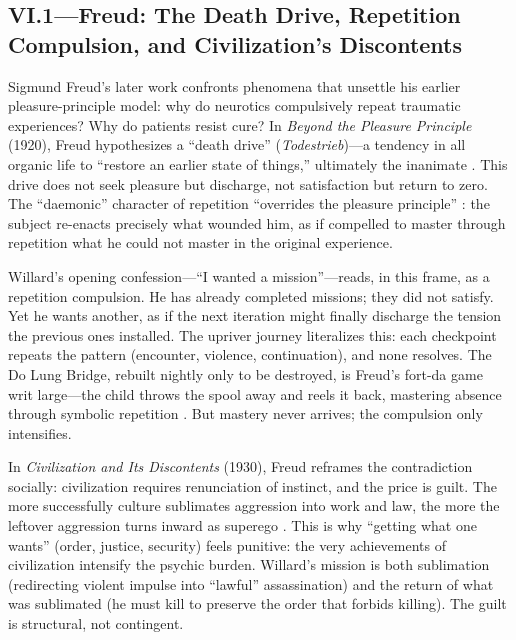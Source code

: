 \subsection*{VI.1—Freud: The Death Drive, Repetition Compulsion, and Civilization's Discontents}
\label{ssec:vi-freud}

Sigmund Freud's later work confronts phenomena that unsettle his earlier pleasure-principle 
model: why do neurotics compulsively repeat traumatic experiences? Why do patients resist cure? 
In \textit{Beyond the Pleasure Principle} (1920), Freud hypothesizes a ``death drive'' 
(\emph{Todestrieb})---a tendency in all organic life to ``restore an earlier state of things,'' 
ultimately the inanimate \parencite[p.~38]{FreudBeyond1955}. This drive does not seek pleasure 
but discharge, not satisfaction but return to zero. The ``daemonic'' character of repetition 
``overrides the pleasure principle'' \parencite[p.~22]{FreudBeyond1955}: the subject 
re-enacts precisely what wounded him, as if compelled to master through repetition what he 
could not master in the original experience.

Willard's opening confession---``I wanted a mission''---reads, in this frame, as a repetition 
compulsion. He has already completed missions; they did not satisfy. Yet he wants another, as 
if the next iteration might finally discharge the tension the previous ones installed. The 
upriver journey literalizes this: each checkpoint repeats the pattern (encounter, violence, 
continuation), and none resolves. The Do Lung Bridge, rebuilt nightly only to be destroyed, is 
Freud's fort-da game writ large---the child throws the spool away and reels it back, mastering 
absence through symbolic repetition \parencite[pp.~14--16]{FreudBeyond1955}. But mastery never 
arrives; the compulsion only intensifies.

In \textit{Civilization and Its Discontents} (1930), Freud reframes the contradiction 
socially: civilization requires renunciation of instinct, and the price is guilt. The more 
successfully culture sublimates aggression into work and law, the more the leftover aggression 
turns inward as superego \parencite[pp.~70--97]{FreudCivilization1961}. This is why ``getting 
what one wants'' (order, justice, security) feels punitive: the very achievements of 
civilization intensify the psychic burden. Willard's mission is both sublimation (redirecting 
violent impulse into ``lawful'' assassination) and the return of what was sublimated (he must 
kill to preserve the order that forbids killing). The guilt is structural, not contingent.

